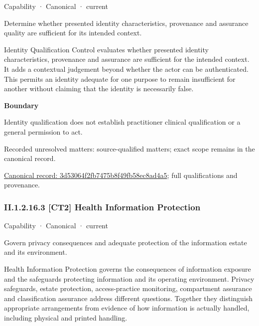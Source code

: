 \label{element:3d53064f2fb7475b8f49fb58ec8ad4a5}
{\small Capability · Canonical · current}\par

Determine whether presented identity characteristics, provenance and assurance quality are sufficient for its intended context.



Identity Qualification Control evaluates whether presented identity characteristics, provenance and assurance are sufficient for the intended context. It adds a contextual judgement beyond whether the actor can be authenticated. This permits an identity adequate for one purpose to remain insufficient for another without claiming that the identity is necessarily false.



\textbf{Boundary}



Identity qualification does not establish practitioner clinical qualification or a general permission to act.


{\small Recorded unresolved matters: source-qualified matters; exact scope remains in the canonical record.}\par
{\footnotesize \href{../../../../continuum/strategy/capability/3d53064f2fb7475b8f49fb58ec8ad4a5.md}{Canonical record: 3d53064f2fb7475b8f49fb58ec8ad4a5}; full qualifications and provenance.}\par
\subsubsection*{II.1.2.16.3 [CT2] Health Information Protection}
\label{navigation:II.1.2.16.3}

\label{element:4ae0de8fa16840d09ab2ef3f5545a5e7}
{\small Capability · Canonical · current}\par

Govern privacy consequences and adequate protection of the information estate and its environment.



Health Information Protection governs the consequences of information exposure and the safeguards protecting information and its operating environment. Privacy safeguards, estate protection, access-practice monitoring, compartment assurance and classification assurance address different questions. Together they distinguish appropriate arrangements from evidence of how information is actually handled, including physical and printed handling.



